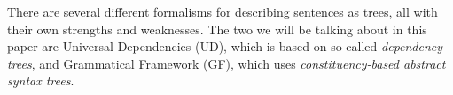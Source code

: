 






There are several different formalisms for describing sentences as trees, all with their own strengths and weaknesses.
The two we will be talking about in this paper are Universal Dependencies (UD), which is based on so called \emph{dependency trees}, and Grammatical Framework (GF), which uses \emph{constituency-based abstract syntax trees}.








